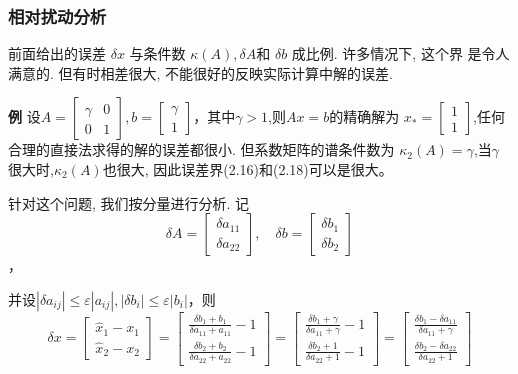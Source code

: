 \documentclass[12pt,a4paper]{article}
\begin{document}
\subsubsection{相对扰动分析}
前面给出的误差 $\delta x$ 与条件数 $\kappa(A), \delta A$和 $\delta b$ 成比例. 许多情况下, 这个界
是令人满意的. 但有时相差很大, 不能很好的反映实际计算中解的误差.


{\bfseries 例} 设$A=\left[\begin{array}{ll}{\gamma} & {0} \\ {0} & {1}\end{array}\right], b=\left[\begin{array}{l}{\gamma} \\ {1}\end{array}\right]$，其中$\gamma > 1$,则$Ax = b$的精确解为
$x_{*}=\left[\begin{array}{l}{1} \\ {1}\end{array}\right]$,任何合理的直接法求得的解的误差都很小. 但系数矩阵的谱条件数为 $\kappa_{2}(A)=\gamma$,当$\gamma$很大时,$\kappa_{2}(A)$也很大, 因此误差界(2.16)和(2.18)可以是很大。

针对这个问题, 我们按分量进行分析. 记
\begin{equation}
\delta A=\left[\begin{array}{c}{\delta a_{11}} \\ {\delta a_{22}}\end{array}\right], \quad \delta b=\left[\begin{array}{c}{\delta b_{1}} \\ {\delta b_{2}}\end{array}\right]
\end{equation}，

并设$\left|\delta a_{i j}\right| \leq \varepsilon\left|a_{i j}\right|,\left|\delta b_{i}\right| \leq \varepsilon\left|b_{i}\right|$，则
\begin{equation}
\delta x=\left[\begin{array}{c}{\hat{x}_{1}-x_{1}} \\ {\hat{x}_{2}-x_{2}}\end{array}\right]=\left[\begin{array}{c}{\frac{\delta b_{1}+b_{1}}{\delta a_{11}+a_{11}}-1} \\ {\frac{\delta b_{2}+b_{2}}{\delta a_{22}+a_{22}}-1}\end{array}\right]=\left[\begin{array}{c}{\frac{\delta b_{1}+\gamma}{\delta a_{11}+\gamma}-1} \\ {\frac{\delta b_{2}+1}{\delta a_{22}+1}-1}\end{array}\right]=\left[\begin{array}{c}{\frac{\delta b_{1}-\delta a_{11}}{\delta a_{11}+\gamma}} \\ {\frac{\delta b_{2}-\delta a_{22}}{\delta a_{22}+1}}\end{array}\right]
\end{equation}
\end{document}
